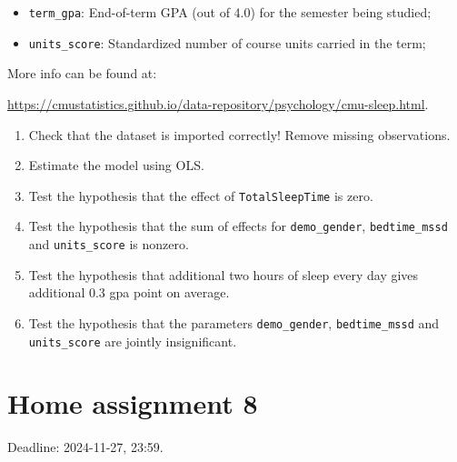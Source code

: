 \documentclass[12pt]{article}
\begin{document}
\begin{enumerate}
\begin{itemize}
    \item \verb|term_gpa|: End-of-term GPA (out of 4.0) for the semester being studied;
    
    \item \verb|units_score|: Standardized number of course units carried in the term;
    \end{itemize}
    
    More info can be found at: 
    
    \url{https://cmustatistics.github.io/data-repository/psychology/cmu-sleep.html}.
    
    \begin{enumerate}
        \item Check that the dataset is imported correctly! Remove missing observations. 
        \item Estimate the model using OLS.
        \item Test the hypothesis that the effect of \verb|TotalSleepTime| is zero.
        \item Test the hypothesis that the sum of effects for \verb|demo_gender|, \verb|bedtime_mssd| and \verb|units_score| is nonzero.
        \item Test the hypothesis that additional two hours of sleep every day gives additional 0.3 gpa point on average.
        \item Test the hypothesis that the parameters \verb|demo_gender|, \verb|bedtime_mssd| and \verb|units_score| are jointly insignificant.
    \end{enumerate}
    

\end{enumerate}




\section*{Home assignment 8}

Deadline: 2024-11-27, 23:59.
\end{document}
